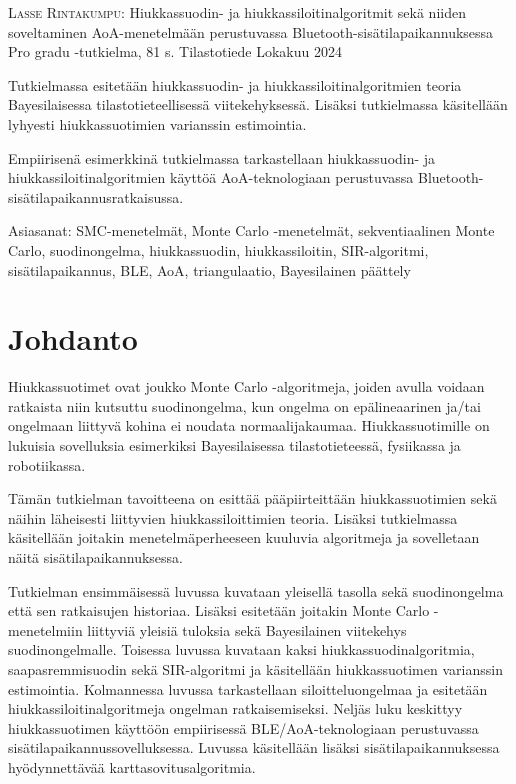 \documentclass[
  12pt,
  a4paper, twoside]{book}
\newcommand{\tekija}{{Lasse Rintakumpu}}
\newcommand{\otsikko}{{Hiukkassuodin- ja hiukkassiloitinalgoritmit sekä niiden soveltaminen AoA-menetelmään perustuvassa Bluetooth-sisätilapaikannuksessa}}
\newcommand{\tutkielma}{{Pro gradu }}
\newcommand{\aika}{{Lokakuu 2024}}
\newcommand{\paaaine}{{Tilastotiede}}
\begin{document}
\noindent \textsc{\tekija}: \otsikko \newline
\tutkielma-tutkielma, 81 s. \newline
\paaaine \newline
\aika
\par\noindent{\rule{\textwidth}{.2mm}} \newline


\vspace{4mm}\noindent Tutkielmassa esitetään hiukkassuodin- ja hiukkassiloitinalgoritmien teoria Bayesilaisessa tilastotieteellisessä viitekehyksessä. Lisäksi tutkielmassa käsitellään lyhyesti hiukkassuotimien varianssin estimointia.

\vspace{4mm}\noindent Empiirisenä esimerkkinä tutkielmassa tarkastellaan hiukkassuodin- ja hiukkassiloitinalgoritmien käyttöä AoA-teknologiaan perustuvassa Bluetooth-sisätilapaikannusratkaisussa.

\vspace{4mm}\noindent Asiasanat: SMC-menetelmät, Monte Carlo -menetelmät, sekventiaalinen Monte Carlo, suodinongelma, hiukkassuodin, hiukkassiloitin, SIR-algoritmi, sisätilapaikannus, BLE, AoA, triangulaatio, Bayesilainen päättely

\cleardoublepage

\cleardoublepage

\pagestyle{plain} 

{
\hypersetup{linkcolor=blue}
\setcounter{tocdepth}{2}
\tableofcontents
}
\setlength\parindent{24pt}
\setlength\parskip{3pt}

\chapter{Johdanto}

Hiukkassuotimet ovat joukko Monte Carlo -algoritmeja, joiden avulla voidaan ratkaista niin kutsuttu suodinongelma, kun ongelma on epälineaarinen ja/tai ongelmaan liittyvä kohina ei noudata normaalijakaumaa. Hiukkassuotimille on lukuisia sovelluksia esimerkiksi Bayesilaisessa tilastotieteessä, fysiikassa ja robotiikassa.

Tämän tutkielman tavoitteena on esittää pääpiirteittään hiukkassuotimien sekä näihin läheisesti liittyvien hiukkassiloittimien teoria. Lisäksi tutkielmassa käsitellään joitakin menetelmäperheeseen kuuluvia algoritmeja ja sovelletaan näitä sisätilapaikannuksessa.

Tutkielman ensimmäisessä luvussa kuvataan yleisellä tasolla sekä suodinongelma että sen ratkaisujen historiaa. Lisäksi esitetään joitakin Monte Carlo -menetelmiin liittyviä yleisiä tuloksia sekä Bayesilainen viitekehys suodinongelmalle. Toisessa luvussa kuvataan kaksi hiukkassuodinalgoritmia, saapasremmisuodin sekä SIR-algoritmi ja käsitellään hiukkassuotimen varianssin estimointia. Kolmannessa luvussa tarkastellaan siloitteluongelmaa ja esitetään hiukkassiloitinalgoritmeja ongelman ratkaisemiseksi. Neljäs luku keskittyy hiukkassuotimen käyttöön empiirisessä BLE/AoA-teknologiaan perustuvassa sisätilapaikannussovelluksessa. Luvussa käsitellään lisäksi sisätilapaikannuksessa hyödynnettävää karttasovitusalgoritmia.
\end{document}

